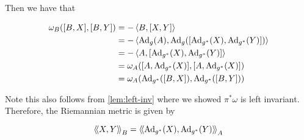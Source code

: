 \documentclass{article}
\DeclareMathOperator{\SU}{SU}
\newcommand{\su}{\mathfrak{su}}
\renewcommand{\tilde}{\widetilde}
\newcommand{\iinner}[1]{\left\langle\!\left\langle #1 \right\rangle\!\right\rangle}
\begin{document}
Then we have that

\begin{align*}
    \omega_B([B, X], [B, Y]) &= -\left\langle B, [X, Y] \right\rangle \\
    &= -\left\langle \operatorname{Ad}_g(A), \operatorname{Ad}_g([\operatorname{Ad}_{g^*}(X), \operatorname{Ad}_{g^*}(Y)]) \right\rangle \\
    &= -\left\langle A, [\operatorname{Ad}_{g^*}(X), \operatorname{Ad}_{g^*}(Y)] \right\rangle \\
    &= \omega_A([A, \operatorname{Ad}_{g^*}(X)], [A, \operatorname{Ad}_{g^*}(X)]) \\
    &= \omega_A(\operatorname{Ad}_{g^*}([B, X]), \operatorname{Ad}_{g^*}([B, Y]))
\end{align*}

Note this also follows from \cref{lem:left-inv} where we showed \(\pi^*\omega\) is left invariant. Therefore, the Riemannian metric is given by

\[\iinner{X, Y}_B = \iinner{\Ad_{g^*}(X), \Ad_{g^*}(Y)}_A\]















\printbibliography
\end{document}
